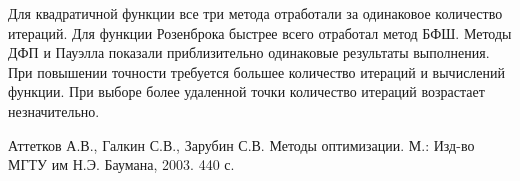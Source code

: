 \documentclass[12pt, a4paper]{article}
\begin{document}
Для квадратичной функции все три метода отработали за одинаковое количество итераций. Для функции Розенброка быстрее всего отработал метод БФШ. Методы ДФП и Пауэлла показали приблизительно одинаковые результаты выполнения. При повышении точности требуется большее количество итераций и вычислений функции. При выборе более удаленной точки количество итераций возрастает незначительно.

\begin{thebibliography}{10}
 Аттетков А.В., Галкин С.В., Зарубин С.В. Методы оптимизации. М.: Изд-во МГТУ им Н.Э. Баумана, 2003. 440 с.
\end{thebibliography}
\end{document}
